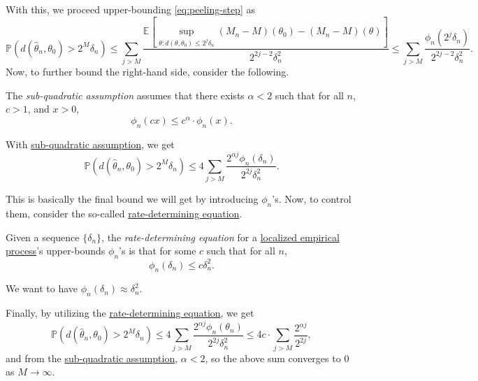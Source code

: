 With this, we proceed upper-bounding \autoref{eq:peeling-step} as
\[
	\mathbb{P} (d(\hat{\theta} _n, \theta _0) > 2^M \delta _n)
	\leq \sum_{j > M} \frac{\mathbb{E}_{}\left[\sup _{\theta \colon d(\theta , \theta _0) \leq 2^j \delta _n} (M_n - M)(\theta _0) - (M_n - M)(\theta ) \right] }{2^{2j - 2} \delta _n^2 }
	\leq \sum_{j > M} \frac{\phi _n(2^j \delta _n)}{2^{2j - 2} \delta _n^2}.
\]
Now, to further bound the right-hand side, consider the following.

\begin{definition}\label{def:sub-quadratic-assumption}
	The \emph{sub-quadratic assumption} assumes that there exists \(\alpha < 2\) such that for all \(n\), \(c > 1\), and \(x > 0\),
	\[
		\phi _n(cx) \leq c^\alpha \cdot \phi _n(x).
	\]
\end{definition}

With \hyperref[def:sub-quadratic-assumption]{sub-quadratic assumption}, we get
\[
	\mathbb{P} (d(\hat{\theta} _n, \theta _0) > 2^M \delta _n)
	\leq 4 \sum_{j > M} \frac{2^{\alpha j} \phi _n(\delta _n)}{2^{2j} \delta _n^2}.
\]

This is basically the final bound we will get by introducing \(\phi _n\)'s. Now, to control them, consider the so-called \hyperref[def:rate-determining-equation]{rate-determining equation}.

\begin{definition}\label{def:rate-determining-equation}
	Given a sequence \(\{ \delta _n \} \), the \emph{rate-determining equation} for a \hyperref[def:localized-EP]{localized empirical process}'s upper-bounds \(\phi _n\)'s is that for some \(c\) such that for all \(n\),
	\[
		\phi _n(\delta _n) \leq c \delta _n^2.
	\]
\end{definition}

\begin{intuition}
	We want to have \(\phi _n(\delta _n) \approx \delta _n^2\).
\end{intuition}

Finally, by utilizing the \hyperref[def:rate-determining-equation]{rate-determining equation}, we get
\[
	\mathbb{P} (d(\hat{\theta} _n, \theta _0) > 2^M \delta _n)
	\leq 4 \sum_{j > M} \frac{2^{\alpha j} \phi _n(\theta _n)}{2^{2j} \delta _n^2}
	\leq 4c\cdot \sum_{j > M} \frac{2^{\alpha j}}{2^{2j}} ,
\]
and from the \hyperref[def:sub-quadratic-assumption]{sub-quadratic assumption}, \(\alpha < 2\), so the above sum converges to \(0\) as \(M \to \infty \).

